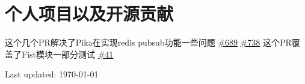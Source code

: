 \documentclass[11pt,a4paper]{moderncv}
\begin{document}
\section{个人项目以及开源贡献}
\renewcommand{\baselinestretch}{1.2}

{这个几个PR解决了Pika在实现redis pubsub功能一些问题}{}{}{}
{\href{https://github.com/Qihoo360/pika/pull/689}{\#689} \href{https://github.com/Qihoo360/pika/pull/738}{\#738}}
{这个PR覆盖了Fist模块一部分测试}{}{}{}
{\href{https://github.com/f-prime/fist/pull/41}{\#41}}


\vspace*{0.2\baselineskip}

\vspace*{0.2\baselineskip}
\vspace*{0.2\baselineskip}
\vspace*{0.2\baselineskip}
{\footnotesize Last updated: \today} 
\renewcommand{\baselinestretch}{1.0}
\closesection{}                   %
\renewcommand{\listitemsymbol}{-} %
\end{document}
